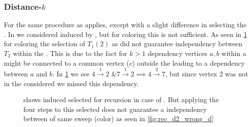 	\subsubsection{Distance-$k$}
	For \DK the same procedure as \DONE applies, except with a slight difference in selecting the \subgraph. In \DONE we considered \subgraphs induced by \levelGroups, but for \DK coloring this is not sufficient. As seen in \cref{fig:rec_d2_wrong} for \DTWO coloring the selection of $T_1(2)$ as \subgraph did not guarantee \DTWO independency between \levelGroup $T_2$ within the \subgraph. This is due to the fact for $k>1$ dependency vertices $a,b$ within a \subgraph might be connected to a common vertex ($c$) outside the \subgraph leading to a \DK dependency between $a$ and $b$. In \cref{fig:rec_d2_wrong} we see 	$4 \xrightarrow{1} 2 \text{ \& } 7 \xrightarrow{1} 2 	\implies 4 \xrightarrow{2} 7$, but since vertex 2 was not in the \subgraph considered we missed this dependency. 

	
     \begin{figure}[thbp]
     	\centering
     	\hspace{0.6em}
     	\hspace{0.6em}
     	\hspace{0.6em}
     	\caption{ shows \levelGroup induced \subgraph selected for recursion in case of \DTWO. But applying the four steps to this selected \subgraph does not guarantee a \DTWO independency between \levelGroup of same sweep (color) as seen in \cref{fig:rec_d2_wrong_d}}
     	\label{fig:rec_d2_wrong}
     \end{figure}
   
